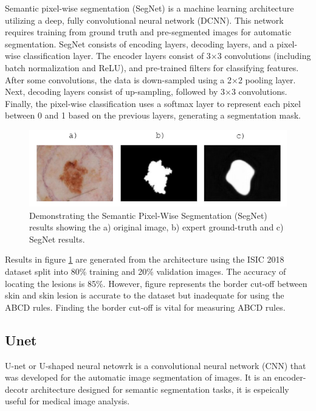 Semantic pixel-wise segmentation (SegNet) is a machine learning architecture utilizing a deep, fully convolutional neural network (DCNN). This network requires training from ground truth and pre-segmented images for automatic segmentation. SegNet consists of encoding layers, decoding layers, and a pixel-wise classification layer. The encoder layers consist of 3$\times$3 convolutions (including batch normalization and ReLU), and pre-trained filters for classifying features. After some convolutions, the data is down-sampled using a 2$\times$2 pooling layer. Next, decoding layers consist of up-sampling, followed by 3$\times$3 convolutions. Finally, the pixel-wise classification uses a softmax layer to represent each pixel between 0 and 1 based on the previous layers, generating a segmentation mask.

\begin{figure}[hb]
\centering
\includegraphics[scale=1.2]{images/border-seg.png}
\caption{Demonstrating the Semantic Pixel-Wise Segmentation (SegNet) results showing the a) original image, b) expert ground-truth and c) SegNet results.}\label{SegNet}
\end{figure}

Results in figure \ref{SegNet} are generated from the architecture using the ISIC 2018 dataset split into 80\% training and 20\% validation images. The accuracy of locating the lesions is 85\%. However, figure represents the border cut-off between skin and skin lesion is accurate to the dataset but inadequate for using the ABCD rules. Finding the border cut-off is vital for measuring ABCD rules\cite{Pereira2020}.

\subsection{Unet}
U-net or U-shaped neural netowrk is a convolutional neural network (CNN) that was developed for the automatic image segmentation of images. It is an encoder-decotr architecture designed for semantic segmentation tasks, it is espeically useful for medical image analysis\cite{zhou2020}. 


